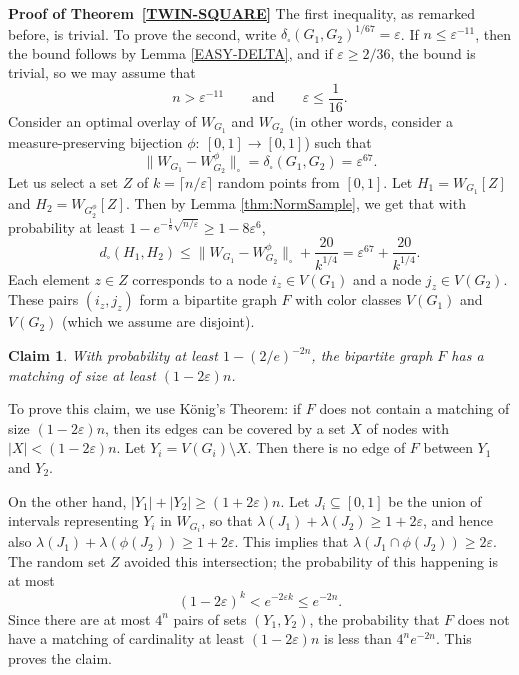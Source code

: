 \documentclass[12pt]{article}
\newtheorem{claim}[theorem]{Claim}
\numberwithin{equation}{section}
\def\eps{\varepsilon}
\begin{document}
\medskip

{\bf\noindent Proof of Theorem~\ref{TWIN-SQUARE}} The first
inequality, as remarked before, is trivial. To prove the second,
write $\delta_\square(G_1,G_2)^{1/{ 67}}=\eps$. If $n\leq
\eps^{-11}$, then the bound follows by Lemma \ref{EASY-DELTA}, and
if $\eps\geq {2/36}$, the bound is trivial, so we may assume that
\begin{equation}\label{N-BOUND}
n>\eps^{-11}{\qquad\text{and}\qquad \eps\leq \frac 1{16}.}
\end{equation}
Consider an optimal overlay of $W_{G_1}$ and $W_{G_2}$ (in other
words, consider a measure-preserving bijection
$\phi:~[0,1]\to[0,1]$) such that
\[
\|W_{G_1}-W_{G_2}^\phi\|_\square = \delta_\square(G_1,G_2)
=\eps^{{67}}.
\]
Let us select a set $Z$ of $k=\lceil n/\eps\rceil$ random points from
$[0,1]$. Let $H_1=W_{G_1}[Z]$ and $H_2=W_{G_2^\phi}[Z]$. Then by
Lemma \ref{thm:NormSample}, we get that with probability
at least
{ $1-e^{-\frac 18\sqrt{n/\eps}}\geq 1-8\eps^6$,}
\[
d_\square(H_1,H_2)\le \|W_{G_1}-W_{G_2}^\phi\|_\square +
\frac{{20}}{k^{1/4}} = \eps^{ 67} +\frac{{20}}{k^{1/4}}.
\]
Each element $z\in Z$ corresponds to a node $i_z\in V(G_1)$ and a
node $j_z\in V(G_2)$. These pairs $(i_z,j_z)$ form a bipartite graph
$F$ with color classes $V(G_1)$ and $V(G_2)$ (which we assume are
disjoint).

\begin{claim}\label{MATCHING}
With probability at least $1-{(2/e)^{-2n}}$, the bipartite graph $F$ has a
matching of size at least $(1-2\eps)n$.
\end{claim}

To prove this claim, we use K\"onig's Theorem: if $F$ does not
contain a matching of size $(1-2\eps)n$, then its edges can be
covered by a set $X$ of nodes with $|X|<(1-2\eps)n$. Let
$Y_i=V(G_i)\setminus X$.  Then there is no edge of $F$ between $Y_1$
and $Y_2$.

On the other hand, $|Y_1|+|Y_2|\ge (1+2\eps)n$. Let
$J_i\subseteq[0,1]$ be the union of intervals representing $Y_i$ in
$W_{G_i}$, so that $\lambda(J_1)+\lambda(J_2)\ge 1+2\eps$, and hence
also $\lambda(J_1)+\lambda(\phi(J_2))\ge 1+2\eps$. This implies that
$\lambda(J_1\cap \phi(J_2))\ge2\eps$. The random set $Z$ avoided this
intersection; the probability of this happening is at most
\[
(1-2\eps)^k < e^{-2\eps k}\leq e^{-2n}.
\]
Since there are at most $4^n$ pairs of sets $(Y_1,Y_2)$, the
probability that $F$ does not have a matching of cardinality at least
$(1-2\eps)n$ is less than $4^n e^{-2n}$. This proves
the claim.
\end{document}
